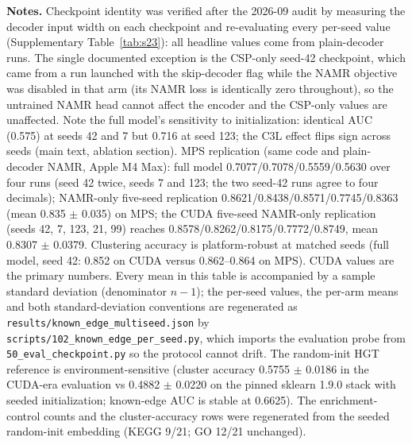 \documentclass[11pt,a4paper]{article}
\newcommand{\supptab}[1]{Supplementary Table~\ref{#1}}
\begin{document}
\begin{table}[H]
\centering
\caption{\textbf{Same-code multi-seed ablation stability (known-edge AUC, plain-decoder NAMR).} All variants were retrained with the identical code version (plain-decoder NAMR; Methods) at seeds 42, 7 and 123;evaluation pairs are fixed (seed 42).}

\smallskip
{\footnotesize \noindent \textbf{Notes.} Checkpoint identity was verified after the 2026-09 audit by measuring the decoder input width on each checkpoint and re-evaluating every per-seed value (\supptab{tab:s23}): all headline values come from plain-decoder runs. The single documented exception is the CSP-only seed-42 checkpoint, which came from a run launched with the skip-decoder flag while the NAMR objective was disabled in that arm (its NAMR loss is identically zero throughout), so the untrained NAMR head cannot affect the encoder and the CSP-only values are unaffected. Note the full model's sensitivity to initialization: identical AUC (0.575) at seeds 42 and 7 but 0.716 at seed 123; the C3L effect flips sign across seeds (main text, ablation section). MPS replication (same code and plain-decoder NAMR, Apple M4 Max): full model 0.7077/0.7078/0.5559/0.5630 over four runs (seed 42 twice, seeds 7 and 123; the two seed-42 runs agree to four decimals); NAMR-only five-seed replication 0.8621/0.8438/0.8571/0.7745/0.8363 (mean 0.835 $\pm$ 0.035) on MPS; the CUDA five-seed NAMR-only replication (seeds 42, 7, 123, 21, 99) reaches 0.8578/0.8262/0.8175/0.7772/0.8749, mean 0.8307 $\pm$ 0.0379. Clustering accuracy is platform-robust at matched seeds (full model, seed 42: 0.852 on CUDA versus 0.862--0.864 on MPS). CUDA values are the primary numbers. Every mean in this table is accompanied by a sample standard deviation (denominator $n-1$); the per-seed values, the per-arm means and both standard-deviation conventions are regenerated as \texttt{results/known\_\allowbreak edge\_\allowbreak multiseed.\allowbreak json} by \texttt{scripts/102\_\allowbreak known\_\allowbreak edge\_\allowbreak per\_\allowbreak seed.\allowbreak py}, which imports the evaluation probe from \texttt{50\_\allowbreak eval\_\allowbreak checkpoint.\allowbreak py} so the protocol cannot drift. The random-init HGT reference is environment-sensitive (cluster accuracy 0.5755 $\pm$ 0.0186 in the CUDA-era evaluation vs 0.4882 $\pm$ 0.0220 on the pinned sklearn 1.9.0 stack with seeded initialization; known-edge AUC is stable at 0.6625). The enrichment-control counts and the cluster-accuracy rows were regenerated from the seeded random-init embedding (KEGG 9/21; GO 12/21 unchanged).}


\end{table}
\end{document}

